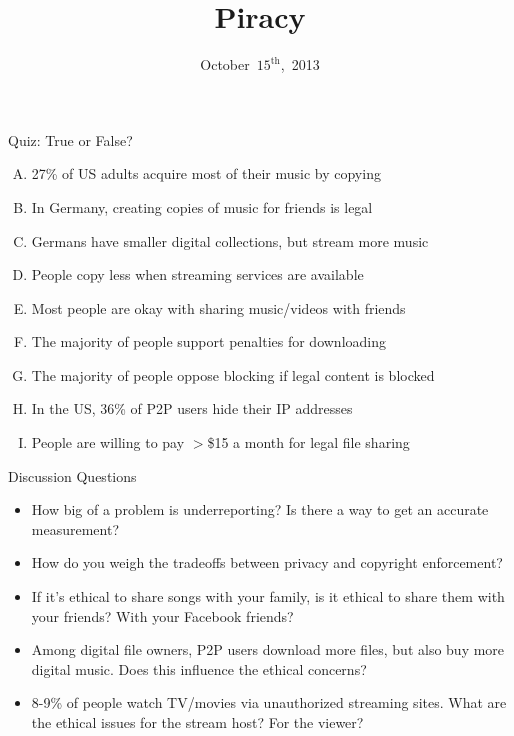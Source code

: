 \documentclass{beamer}
\title{Piracy}
\date{October~$15^{\text{th}}$,~2013}
\begin{document}
\begin{frame}
\titlepage
\end{frame}

\begin{frame}{Quiz: True or False?}

\begin{enumerate}[(A)]
\item<1> 27\% of US adults acquire most of their music by copying %
\item<1-2> In Germany, creating copies of music for friends is legal
\item<1> Germans have smaller digital collections, but stream more music %
\item<1-2> People copy less when streaming services are available
\item<1> Most people are okay with sharing music/videos with friends %
\item<1-2> The majority of people support penalties for downloading
\item<1> The majority of people oppose blocking if legal content is blocked %
\item<1> In the US, 36\% of P2P users hide their IP addresses %
\item<1-2> People are willing to pay $>$\$15 a month for legal file sharing
\end{enumerate}
\end{frame}

\begin{frame}{Discussion Questions}
\begin{itemize}
\item How big of a problem is underreporting? Is there a way to get an accurate measurement?
\pause
\bigskip
\item How do you weigh the tradeoffs between privacy and copyright enforcement?
\pause
\bigskip
\item If it's ethical to share songs with your family, is it ethical to share them with your friends? With your Facebook friends?
\pause
\bigskip
\item Among digital file owners, P2P users download more files, but also buy more digital music. Does this influence the ethical concerns?
\pause
\bigskip
\item 8-9\% of people watch TV/movies via unauthorized streaming sites. What are the ethical issues for the stream host? For the viewer?
\end{itemize}
\end{frame}
\end{document}
